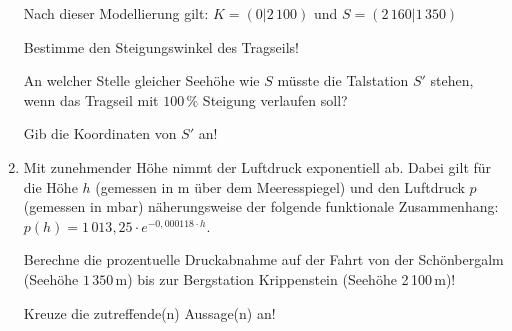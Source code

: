 \begin{langesbeispiel}
\begin{enumerate}
	Nach dieser Modellierung gilt: $K=(0|2\,100)$ und $S=(2\,160|1\,350)$
	
	 Bestimme den Steigungswinkel des Tragseils!
	
	An welcher Stelle gleicher Seehöhe wie $S$ müsste die Talstation $S'$ stehen, wenn das Tragseil mit $100\,\%$ Steigung verlaufen soll?
	
	Gib die Koordinaten von $S'$ an!
	
		\item Mit zunehmender Höhe nimmt der Luftdruck exponentiell ab. Dabei gilt für die Höhe $h$ (gemessen in m über dem Meeresspiegel) und den Luftdruck $p$ (gemessen in mbar) näherungsweise der folgende funktionale Zusammenhang: $p(h)=1\,013,25\cdot e^{-0,000118\cdot h}$.
		
		Berechne die prozentuelle Druckabnahme auf der Fahrt von der Schönbergalm (Seehöhe $1\,350$\,m) bis zur Bergstation Krippenstein (Seehöhe 2\,100\,m)!
		
		Kreuze die zutreffende(n) Aussage(n) an!
		
						\end{enumerate}\leer
				
\end{langesbeispiel}
